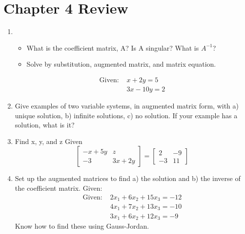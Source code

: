 \documentclass[14pt]{extarticle}
\begin{document}
\section*{Chapter 4 Review}
\begin{enumerate}
	\item \begin{itemize}
		\item What is the coefficient matrix, A? Is A singular? What is $A^{-1}$?
		\item Solve by substitution, augmented matrix, and matrix equation.
	\end{itemize}
	\begin{align*}
		\text{Given: } &x+2y = 5\\
		&3x - 10y =2	
	\end{align*}

	\item Give examples of two variable systems, in augmented matrix form, with a) unique solution, b) infinite solutions, c) no solution. If your example has a solution, what is it?
	
	\item Find x, y, and z
	Given
	$$\begin{bmatrix}
		-x + 5y & z \\
		-3 & 3x + 2y
	\end{bmatrix}
	= 
	\begin{bmatrix}
		2 & -9 \\
		-3 & 11
	\end{bmatrix}
	$$
	
	\item Set up the augmented matrices to find a) the solution and b) the inverse of the coefficient matrix. Given:
	\begin{align*}
		\text{Given: } &2x_1+6x_2 + 15x_3 = -12 \\
		&4x_1+7x_2 + 13x_3= -10 \\
		&3x_1+6x_2 + 12x_3 = -9
	\end{align*}
	Know how to find these using Gauss-Jordan.
	

\end{enumerate}
\end{document}
